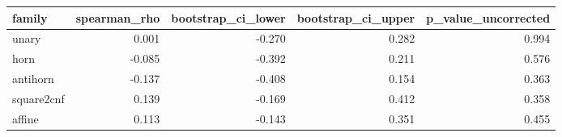 \begin{tabular}{lrrrr}
\toprule
family & spearman\_rho & bootstrap\_ci\_lower & bootstrap\_ci\_upper & p\_value\_uncorrected \\
\midrule
unary & 0.001 & -0.270 & 0.282 & 0.994 \\
horn & -0.085 & -0.392 & 0.211 & 0.576 \\
antihorn & -0.137 & -0.408 & 0.154 & 0.363 \\
square2cnf & 0.139 & -0.169 & 0.412 & 0.358 \\
affine & 0.113 & -0.143 & 0.351 & 0.455 \\
\bottomrule
\end{tabular}

